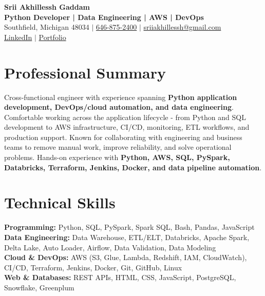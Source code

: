 \documentclass[letterpaper,10pt]{article}
\begin{document}
\fontsize{9.35pt}{10.45pt}\selectfont

\begin{center}
    {\LARGE \textbf{Srii Akhillessh Gaddam}} \\[-1pt]
    \textbf{Python Developer | Data Engineering | AWS | DevOps} \\[2pt]
    Southfield, Michigan 48034 $|$
    \href{tel:6468752400}{646-875-2400} $|$
    \href{mailto:sriiakhillessh@gmail.com}{sriiakhillessh@gmail.com} \\[1pt]
    \href{https://www.linkedin.com/in/srii-akhiilessh-gaddam-b48668191/}{LinkedIn} $|$
    \href{https://sriiakhillesshg.github.io/portfolio/}{Portfolio}
\end{center}
\vspace{-8pt}

\section{Professional Summary}
\small{Cross-functional engineer with experience spanning \textbf{Python application development, DevOps/cloud automation, and data engineering}. Comfortable working across the application lifecycle - from Python and SQL development to AWS infrastructure, CI/CD, monitoring, ETL workflows, and production support. Known for collaborating with engineering and business teams to remove manual work, improve reliability, and solve operational problems. Hands-on experience with \textbf{Python, AWS, SQL, PySpark, Databricks, Terraform, Jenkins, Docker, and data pipeline automation}.}

\section{Technical Skills}
\small{
\textbf{Programming:} Python, SQL, PySpark, Spark SQL, Bash, Pandas, JavaScript \\
\textbf{Data Engineering:} Data Warehouse, ETL/ELT, Databricks, Apache Spark, Delta Lake, Auto Loader, Airflow, Data Validation, Data Modeling \\
\textbf{Cloud \& DevOps:} AWS (S3, Glue, Lambda, Redshift, IAM, CloudWatch), CI/CD, Terraform, Jenkins, Docker, Git, GitHub, Linux \\
\textbf{Web \& Databases:} REST APIs, HTML, CSS, JavaScript, PostgreSQL, Snowflake, Greenplum
}
\end{document}
